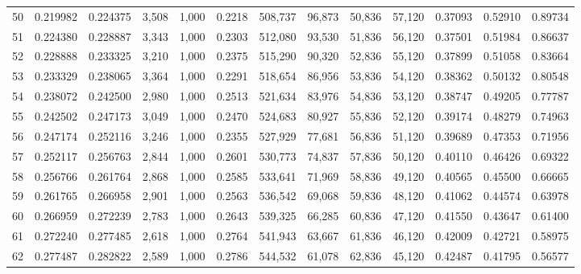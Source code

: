 \begin{tabular}{rrrrrrrrrrrrr}
50  &  0.219982 &  0.224375 &   3,508 &  1,000 &                                     0.2218 &  508,737 &   96,873 &   50,836 &   57,120 &  0.37093 &  0.52910 &  0.89734 \\
51  &  0.224380 &  0.228887 &   3,343 &  1,000 &                                     0.2303 &  512,080 &   93,530 &   51,836 &   56,120 &  0.37501 &  0.51984 &  0.86637 \\
52  &  0.228888 &  0.233325 &   3,210 &  1,000 &                                     0.2375 &  515,290 &   90,320 &   52,836 &   55,120 &  0.37899 &  0.51058 &  0.83664 \\
53  &  0.233329 &  0.238065 &   3,364 &  1,000 &                                     0.2291 &  518,654 &   86,956 &   53,836 &   54,120 &  0.38362 &  0.50132 &  0.80548 \\
54  &  0.238072 &  0.242500 &   2,980 &  1,000 &                                     0.2513 &  521,634 &   83,976 &   54,836 &   53,120 &  0.38747 &  0.49205 &  0.77787 \\
55  &  0.242502 &  0.247173 &   3,049 &  1,000 &                                     0.2470 &  524,683 &   80,927 &   55,836 &   52,120 &  0.39174 &  0.48279 &  0.74963 \\
56  &  0.247174 &  0.252116 &   3,246 &  1,000 &                                     0.2355 &  527,929 &   77,681 &   56,836 &   51,120 &  0.39689 &  0.47353 &  0.71956 \\
57  &  0.252117 &  0.256763 &   2,844 &  1,000 &                                     0.2601 &  530,773 &   74,837 &   57,836 &   50,120 &  0.40110 &  0.46426 &  0.69322 \\
58  &  0.256766 &  0.261764 &   2,868 &  1,000 &                                     0.2585 &  533,641 &   71,969 &   58,836 &   49,120 &  0.40565 &  0.45500 &  0.66665 \\
59  &  0.261765 &  0.266958 &   2,901 &  1,000 &                                     0.2563 &  536,542 &   69,068 &   59,836 &   48,120 &  0.41062 &  0.44574 &  0.63978 \\
60  &  0.266959 &  0.272239 &   2,783 &  1,000 &                                     0.2643 &  539,325 &   66,285 &   60,836 &   47,120 &  0.41550 &  0.43647 &  0.61400 \\
61  &  0.272240 &  0.277485 &   2,618 &  1,000 &                                     0.2764 &  541,943 &   63,667 &   61,836 &   46,120 &  0.42009 &  0.42721 &  0.58975 \\
62  &  0.277487 &  0.282822 &   2,589 &  1,000 &                                     0.2786 &  544,532 &   61,078 &   62,836 &   45,120 &  0.42487 &  0.41795 &  0.56577 \\

\end{tabular}

